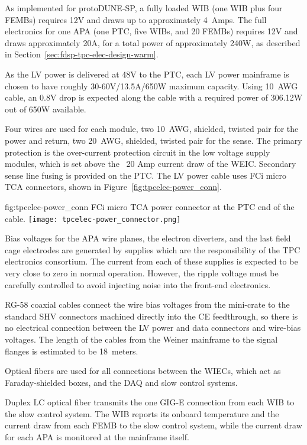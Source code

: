 As implemented for protoDUNE-SP, a fully loaded WIB (one WIB plus four FEMBs) requires
12V and draws up to approximately 4~Amps. The full electronics for one APA (one PTC, five WIBs, and 20 FEMBs) 
requires 12V and draws approximately 20A, for a total power of approximately 240W, as 
described in Section~\ref{sec:fdsp-tpc-elec-design-warm}.

As the LV power is delivered at 48V to the PTC, each LV power mainframe is chosen to have roughly 30-60V/13.5A/650W maximum capacity. Using 10~AWG cable, an 0.8V drop is expected along the cable with a
required power of 306.12W out of 650W available. 

Four wires are used for each module, two 10~AWG,
shielded, twisted pair for the power and return, two 20~AWG, shielded, twisted pair for the sense.
The primary protection is the over-current protection circuit in the low voltage supply modules, which is set above the ~20 Amp current draw of the WEIC.  Secondary sense line fusing is provided on the PTC.
The LV power cable uses FCi micro TCA connectors, 
shown in Figure~\ref{fig:tpcelec-power_conn}.

\begin{dunefigure}
{fig:tpcelec-power_conn}
{FCi micro TCA power connector at the PTC end of the cable.}
\texttt{[image: tpcelec-power\_connector.png]}
\end{dunefigure}

Bias voltages for the APA wire planes, the electron diverters, and the last field cage electrodes are generated by supplies which are the responsibility of the TPC electronics consortium.  The current from each of these supplies is expected to be very close to zero in normal operation.  However, the ripple voltage must be carefully controlled to avoid injecting noise into the front-end electronics.

RG-58 coaxial cables connect the wire bias voltages from the mini-crate to the standard SHV
connectors machined directly into the CE feedthrough, so there is no electrical connection between 
the LV power and data connectors and wire-bias voltages. The length of the cables from the Weiner mainframe
to the signal flanges is estimated to be 18~meters.


Optical fibers are used for all connections between the WIECs, which act as
Faraday-shielded boxes, and the DAQ and slow control systems.

Duplex LC optical fiber transmits the one GIG-E connection from each
WIB to the slow control system. The WIB reports its onboard temperature and the current draw from each FEMB to the slow control system, while the 
current draw for each APA is monitored at the mainframe itself.
